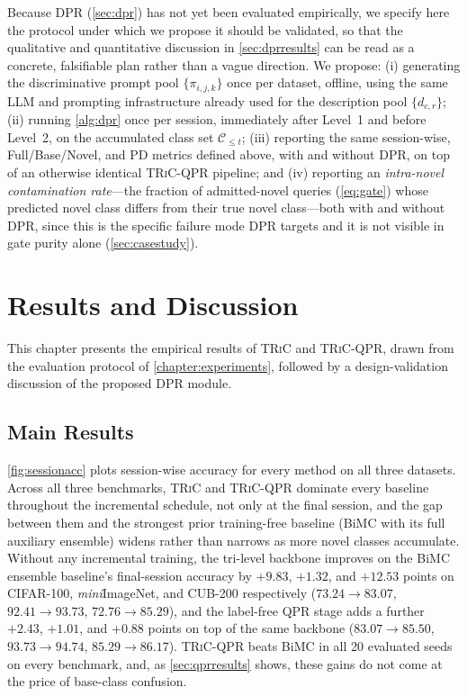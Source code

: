 \documentclass{iutbscthesis}
\begin{document}
Because DPR (\autoref{sec:dpr}) has not yet been evaluated empirically, we specify here the protocol under which we propose it should be validated, so that the qualitative and quantitative discussion in \autoref{sec:dprresults} can be read as a concrete, falsifiable plan rather than a vague direction. We propose: (i) generating the discriminative prompt pool $\{\pi_{i,j,k}\}$ once per dataset, offline, using the same LLM and prompting infrastructure already used for the description pool $\{d_{c,r}\}$; (ii) running \autoref{alg:dpr} once per session, immediately after Level~1 and before Level~2, on the accumulated class set $\mathcal{C}_{\le t}$; (iii) reporting the same session-wise, Full/Base/Novel, and PD metrics defined above, with and without DPR, on top of an otherwise identical \textsc{TRiC}-QPR pipeline; and (iv) reporting an \emph{intra-novel contamination rate}---the fraction of admitted-novel queries (\autoref{eq:gate}) whose predicted novel class differs from their true novel class---both with and without DPR, since this is the specific failure mode DPR targets and it is not visible in gate purity alone (\autoref{sec:casestudy}).


\chapter{Results and Discussion}
\label{chapter:results}

This chapter presents the empirical results of \textsc{TRiC} and \textsc{TRiC}-QPR, drawn from the evaluation protocol of \autoref{chapter:experiments}, followed by a design-validation discussion of the proposed DPR module.

\section{Main Results}
\label{sec:mainresults}

\autoref{fig:sessionacc} plots session-wise accuracy for every method on all three datasets. Across all three benchmarks, \textsc{TRiC} and \textsc{TRiC}-QPR dominate every baseline throughout the incremental schedule, not only at the final session, and the gap between them and the strongest prior training-free baseline (BiMC with its full auxiliary ensemble) widens rather than narrows as more novel classes accumulate. Without any incremental training, the tri-level backbone improves on the BiMC ensemble baseline's final-session accuracy by $+9.83$, $+1.32$, and $+12.53$ points on CIFAR-100, \emph{mini}ImageNet, and CUB-200 respectively ($73.24 \rightarrow 83.07$, $92.41 \rightarrow 93.73$, $72.76 \rightarrow 85.29$), and the label-free QPR stage adds a further $+2.43$, $+1.01$, and $+0.88$ points on top of the same backbone ($83.07\rightarrow 85.50$, $93.73\rightarrow94.74$, $85.29\rightarrow86.17$). \textsc{TRiC}-QPR beats BiMC in all 20 evaluated seeds on every benchmark, and, as \autoref{sec:qprresults} shows, these gains do not come at the price of base-class confusion.
\end{document}
